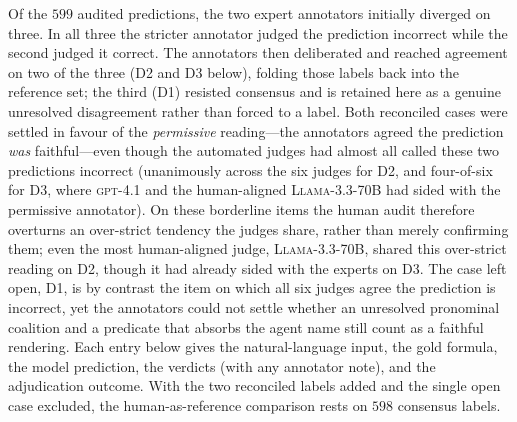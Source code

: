 \documentclass[letterpaper]{article}
\begin{document}
Of the $599$ audited predictions, the two expert annotators initially diverged on three. In all three the stricter annotator judged the prediction incorrect while the second judged it correct. The annotators then deliberated and reached agreement on two of the three (D2 and D3 below), folding those labels back into the reference set; the third (D1) resisted consensus and is retained here as a genuine unresolved disagreement rather than forced to a label. Both reconciled cases were settled in favour of the \emph{permissive} reading---the annotators agreed the prediction \emph{was} faithful---even though the automated judges had almost all called these two predictions incorrect (unanimously across the six judges for D2, and four-of-six for D3, where \textsc{gpt-4.1} and the human-aligned \textsc{Llama-3.3-70B} had sided with the permissive annotator). On these borderline items the human audit therefore overturns an over-strict tendency the judges share, rather than merely confirming them; even the most human-aligned judge, \textsc{Llama-3.3-70B}, shared this over-strict reading on D2, though it had already sided with the experts on D3. The case left open, D1, is by contrast the item on which all six judges agree the prediction is incorrect, yet the annotators could not settle whether an unresolved pronominal coalition and a predicate that absorbs the agent name still count as a faithful rendering. Each entry below gives the natural-language input, the gold formula, the model prediction, the verdicts (with any annotator note), and the adjudication outcome. With the two reconciled labels added and the single open case excluded, the human-as-reference comparison rests on $598$ consensus labels.
\end{document}
